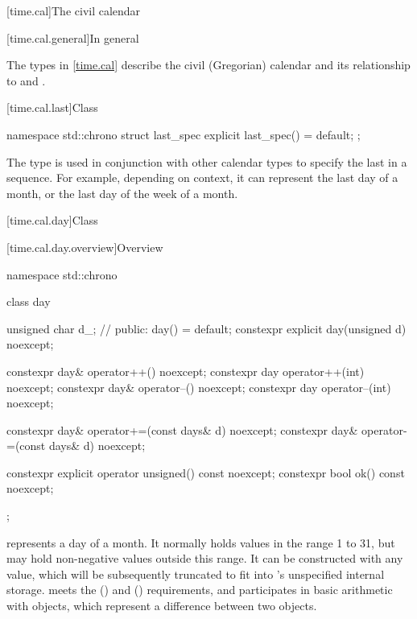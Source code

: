 [time.cal]{The civil calendar}

[time.cal.general]{In general}

\pnum
The types in \ref{time.cal} describe the civil (Gregorian) calendar
and its relationship to  and .

[time.cal.last]{Class }
%

\begin{codeblock}
namespace std::chrono {
  struct last_spec {
    explicit last_spec() = default;
  };
}
\end{codeblock}

\pnum
The type  is used
in conjunction with other calendar types
to specify the last in a sequence.
For example, depending on context,
it can represent the last day of a month,
or the last day of the week of a month.

[time.cal.day]{Class }

[time.cal.day.overview]{Overview}

\begin{codeblock}
namespace std::chrono {
  class day {
    unsigned char d_;           // \expos
  public:
    day() = default;
    constexpr explicit day(unsigned d) noexcept;

    constexpr day& operator++()    noexcept;
    constexpr day  operator++(int) noexcept;
    constexpr day& operator--()    noexcept;
    constexpr day  operator--(int) noexcept;

    constexpr day& operator+=(const days& d) noexcept;
    constexpr day& operator-=(const days& d) noexcept;

    constexpr explicit operator unsigned() const noexcept;
    constexpr bool ok() const noexcept;
  };
}
\end{codeblock}

\pnum
{} represents a day of a month.
It normally holds values in the range 1 to 31,
but may hold non-negative values outside this range.
It can be constructed with any  value,
which will be subsequently truncated to fit into 's unspecified internal storage.
 meets the  ()
and  () requirements,
and participates in basic arithmetic with  objects,
which represent a difference between two  objects.

